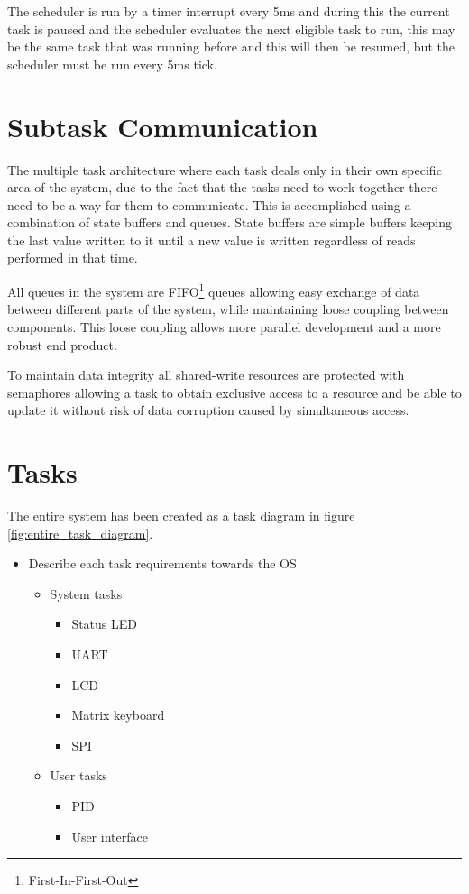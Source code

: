 \documentclass[../../../main]{subfiles}
\begin{document}
The scheduler is run by a timer interrupt every 5ms and during this the current task is paused and the scheduler evaluates the next eligible task to run, this may be the same task that was running before and this will then be resumed, but the scheduler must be run every 5ms tick.

\section{Subtask Communication}

The multiple task architecture where each task deals only in their own specific area of the system, due to the fact that the tasks need to work together there need to be a way for them to communicate.
This is accomplished using a combination of state buffers and queues. State buffers are simple buffers keeping the last value written to it until a new value is written regardless of reads performed in that time.

All queues in the system are FIFO\footnote{First-In-First-Out} queues allowing easy exchange of data between different parts of the system, while maintaining loose coupling between components. This loose coupling allows more parallel development and a more robust end product. 

To maintain data integrity all shared-write resources are protected with semaphores allowing a task to obtain exclusive access to a resource and be able to update it without risk of data corruption caused by simultaneous access.




\section{Tasks}

The entire system has been created as a task diagram in figure \ref{fig:entire_task_diagram}. 


\begin{itemize}
    \item Describe each task requirements towards the OS
        \begin{itemize}
            \item System tasks
                \begin{itemize}
                    \item Status LED
                    \item UART 
                    \item LCD
                    \item Matrix keyboard
                    \item SPI
                \end{itemize}
                 \item User tasks
                \begin{itemize}
                    \item PID
                    \item User interface
                \end{itemize}
        \end{itemize}
\end{itemize}
\end{document}
